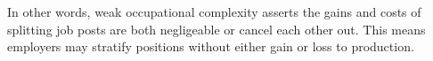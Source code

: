 \documentclass[hidelinks, nonatbib]{elsarticle}
\begin{document}
\begin{axiom}
\begin{subaxiom}
    In other words, weak occupational complexity asserts the gains and costs of splitting job posts are both negligeable or cancel each other out. This means employers may stratify positions without either gain or loss to production.

\end{subaxiom}
\end{axiom}
\end{document}
